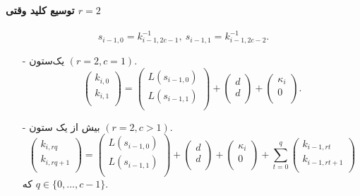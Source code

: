 \paragraph*{توسیع کلید وقتی 
	$r = 2$}
$$s_{i-1,0} = k_{i-1,2c-1}^{-1}, \ s_{i-1,1} = k_{i-1,2c-2}^{-1}.$$
\begin{itemize}
	\item[-]
	یک‌ستون 
	$(r = 2, c = 1)$.
	$$
	\begin{pmatrix}
	k_{i,0}\\
	k_{i,1}\\
	\end{pmatrix} = 
	\begin{pmatrix}
	L(s_{i-1,0})\\
	L(s_{i-1,1})\\
	\end{pmatrix} + 
	\begin{pmatrix}
	d\\
	d\\
	\end{pmatrix} +
	\begin{pmatrix}
	\kappa_{i}\\
	0\\
	\end{pmatrix}.
	$$
	\item[-]
	بیش از یک ستون 
	$(r = 2, c > 1)$.
	$$
	\begin{pmatrix}
	k_{i,rq}\\
	k_{i,rq+1}\\
	\end{pmatrix} = 
	\begin{pmatrix}
	L(s_{i-1,0})\\
	L(s_{i-1,1})\\
	\end{pmatrix} + 
	\begin{pmatrix}
	d\\
	d\\
	\end{pmatrix} + 
	\begin{pmatrix}
	\kappa_{i}\\
	0\\
	\end{pmatrix} + 
	\sum_{t = 0}^{q}
	\begin{pmatrix}
	k_{i-1,rt}\\
	k_{i-1,rt+1}\\
	\end{pmatrix}
	$$
	که 
	$q\in \{0,...,c-1\}$.
\end{itemize}

